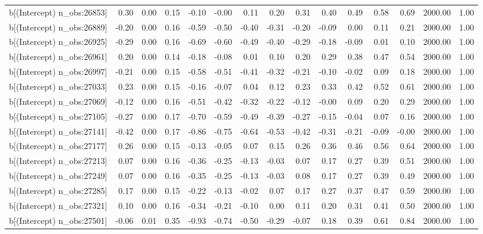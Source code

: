 \begin{table}[ht]
\begin{tabular}{rrrrrrrrrrrrrrr}
  b[(Intercept) n\_obs:26853] & 0.30 & 0.00 & 0.15 & -0.10 & -0.00 & 0.11 & 0.20 & 0.31 & 0.40 & 0.49 & 0.58 & 0.69 & 2000.00 & 1.00 \\ 
  b[(Intercept) n\_obs:26889] & -0.20 & 0.00 & 0.16 & -0.59 & -0.50 & -0.40 & -0.31 & -0.20 & -0.09 & 0.00 & 0.11 & 0.21 & 2000.00 & 1.00 \\ 
  b[(Intercept) n\_obs:26925] & -0.29 & 0.00 & 0.16 & -0.69 & -0.60 & -0.49 & -0.40 & -0.29 & -0.18 & -0.09 & 0.01 & 0.10 & 2000.00 & 1.00 \\ 
  b[(Intercept) n\_obs:26961] & 0.20 & 0.00 & 0.14 & -0.18 & -0.08 & 0.01 & 0.10 & 0.20 & 0.29 & 0.38 & 0.47 & 0.54 & 2000.00 & 1.00 \\ 
  b[(Intercept) n\_obs:26997] & -0.21 & 0.00 & 0.15 & -0.58 & -0.51 & -0.41 & -0.32 & -0.21 & -0.10 & -0.02 & 0.09 & 0.18 & 2000.00 & 1.00 \\ 
  b[(Intercept) n\_obs:27033] & 0.23 & 0.00 & 0.15 & -0.16 & -0.07 & 0.04 & 0.12 & 0.23 & 0.33 & 0.42 & 0.52 & 0.61 & 2000.00 & 1.00 \\ 
  b[(Intercept) n\_obs:27069] & -0.12 & 0.00 & 0.16 & -0.51 & -0.42 & -0.32 & -0.22 & -0.12 & -0.00 & 0.09 & 0.20 & 0.29 & 2000.00 & 1.00 \\ 
  b[(Intercept) n\_obs:27105] & -0.27 & 0.00 & 0.17 & -0.70 & -0.59 & -0.49 & -0.39 & -0.27 & -0.15 & -0.04 & 0.07 & 0.16 & 2000.00 & 1.00 \\ 
  b[(Intercept) n\_obs:27141] & -0.42 & 0.00 & 0.17 & -0.86 & -0.75 & -0.64 & -0.53 & -0.42 & -0.31 & -0.21 & -0.09 & -0.00 & 2000.00 & 1.00 \\ 
  b[(Intercept) n\_obs:27177] & 0.26 & 0.00 & 0.15 & -0.13 & -0.05 & 0.07 & 0.15 & 0.26 & 0.36 & 0.46 & 0.56 & 0.64 & 2000.00 & 1.00 \\ 
  b[(Intercept) n\_obs:27213] & 0.07 & 0.00 & 0.16 & -0.36 & -0.25 & -0.13 & -0.03 & 0.07 & 0.17 & 0.27 & 0.39 & 0.51 & 2000.00 & 1.00 \\ 
  b[(Intercept) n\_obs:27249] & 0.07 & 0.00 & 0.16 & -0.35 & -0.25 & -0.13 & -0.03 & 0.08 & 0.17 & 0.27 & 0.39 & 0.49 & 2000.00 & 1.00 \\ 
  b[(Intercept) n\_obs:27285] & 0.17 & 0.00 & 0.15 & -0.22 & -0.13 & -0.02 & 0.07 & 0.17 & 0.27 & 0.37 & 0.47 & 0.59 & 2000.00 & 1.00 \\ 
  b[(Intercept) n\_obs:27321] & 0.10 & 0.00 & 0.16 & -0.34 & -0.21 & -0.10 & 0.00 & 0.11 & 0.20 & 0.31 & 0.41 & 0.50 & 2000.00 & 1.00 \\ 
  b[(Intercept) n\_obs:27501] & -0.06 & 0.01 & 0.35 & -0.93 & -0.74 & -0.50 & -0.29 & -0.07 & 0.18 & 0.39 & 0.61 & 0.84 & 2000.00 & 1.00 \\ 

\end{tabular}
\end{table}
